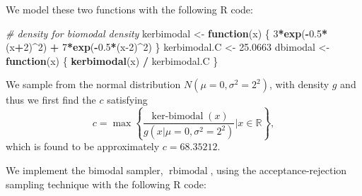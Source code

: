\documentclass[
  10pt,
  twocolumn]{article}
\newenvironment{Shaded}{\begin{snugshade}}{\end{snugshade}}
\newcommand{\CommentTok}[1]{\textcolor[rgb]{0.56,0.35,0.01}{\textit{#1}}}
\newcommand{\ControlFlowTok}[1]{\textcolor[rgb]{0.13,0.29,0.53}{\textbf{#1}}}
\newcommand{\DecValTok}[1]{\textcolor[rgb]{0.00,0.00,0.81}{#1}}
\newcommand{\FloatTok}[1]{\textcolor[rgb]{0.00,0.00,0.81}{#1}}
\newcommand{\FunctionTok}[1]{\textcolor[rgb]{0.13,0.29,0.53}{\textbf{#1}}}
\newcommand{\NormalTok}[1]{#1}
\newcommand{\OtherTok}[1]{\textcolor[rgb]{0.56,0.35,0.01}{#1}}
\newcommand{\SpecialCharTok}[1]{\textcolor[rgb]{0.81,0.36,0.00}{\textbf{#1}}}
\begin{document}
We model these two functions with the following R code:

\begin{Shaded}
\begin{Highlighting}[]
\CommentTok{\# density for biomodal density}
\NormalTok{kerbimodal }\OtherTok{\textless{}{-}} \ControlFlowTok{function}\NormalTok{(x) \{ }\DecValTok{3}\SpecialCharTok{*}\FunctionTok{exp}\NormalTok{(}\SpecialCharTok{{-}}\FloatTok{0.5}\SpecialCharTok{*}\NormalTok{(x}\SpecialCharTok{+}\DecValTok{2}\NormalTok{)}\SpecialCharTok{\^{}}\DecValTok{2}\NormalTok{) }\SpecialCharTok{+} \DecValTok{7}\SpecialCharTok{*}\FunctionTok{exp}\NormalTok{(}\SpecialCharTok{{-}}\FloatTok{0.5}\SpecialCharTok{*}\NormalTok{(x}\DecValTok{{-}2}\NormalTok{)}\SpecialCharTok{\^{}}\DecValTok{2}\NormalTok{) \}}
\NormalTok{kerbimodal.C }\OtherTok{\textless{}{-}} \FloatTok{25.0663}
\NormalTok{dbimodal }\OtherTok{\textless{}{-}} \ControlFlowTok{function}\NormalTok{(x) \{ }\FunctionTok{kerbimodal}\NormalTok{(x) }\SpecialCharTok{/}\NormalTok{ kerbimodal.C \}}
\end{Highlighting}
\end{Shaded}

We sample from the normal distribution \(N(\mu=0,\sigma^2=2^2)\), with
density \(g\) and thus we first find the \(c\) satisfying \[
  c = \max \left\{ \frac{\operatorname{ker-bimodal}(x)}{g(x|\mu=0,\sigma^2=2^2)} | x \in \mathbb{R} \right\},
\] which is found to be approximately \(c = 68.35212\).

We implement the bimodal sampler, \(\operatorname{rbimodal}\), using the
acceptance-rejection sampling technique with the following R code:
\end{document}
